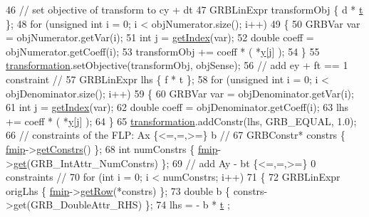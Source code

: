 \begin{DoxyCode}
46   \textcolor{comment}{// set objective of transform to cy + dt}
47   GRBLinExpr transformObj \{ d * \hyperlink{classgrbfrc_1_1CharnesCooper_a8e03048a467411b2147ef10acad3ff4f}{t} \};
48   \textcolor{keywordflow}{for} (\textcolor{keywordtype}{unsigned} \textcolor{keywordtype}{int} i = 0; i < objNumerator.size(); i++)
49    \{
50     GRBVar var = objNumerator.getVar(i);
51     \textcolor{keywordtype}{int} j = \hyperlink{classgrbfrc_1_1CharnesCooper_a48c5969100c05b92d2f60e8f48925b0d}{getIndex}(var);
52     \textcolor{keywordtype}{double} coeff = objNumerator.getCoeff(i);
53     transformObj += coeff * ( *\hyperlink{classgrbfrc_1_1CharnesCooper_a19e3874ce0b6242d4b7f8491bfae472f}{y}[j] );
54    \}
55   \hyperlink{classgrbfrc_1_1CharnesCooper_a9107f891576f27501e5f103dca964359}{transformation}.setObjective(transformObj, objSense);
56   \textcolor{comment}{// add ey + ft == 1 constraint //}
57   GRBLinExpr lhs \{ f * t \};
58   \textcolor{keywordflow}{for} (\textcolor{keywordtype}{unsigned} \textcolor{keywordtype}{int} i = 0; i < objDenominator.size(); i++)
59    \{
60     GRBVar var = objDenominator.getVar(i);
61     \textcolor{keywordtype}{int} j = \hyperlink{classgrbfrc_1_1CharnesCooper_a48c5969100c05b92d2f60e8f48925b0d}{getIndex}(var);
62     \textcolor{keywordtype}{double} coeff = objDenominator.getCoeff(i);
63     lhs += coeff * ( *\hyperlink{classgrbfrc_1_1CharnesCooper_a19e3874ce0b6242d4b7f8491bfae472f}{y}[j] );
64    \}
65   \hyperlink{classgrbfrc_1_1CharnesCooper_a9107f891576f27501e5f103dca964359}{transformation}.addConstr(lhs, GRB\_EQUAL, 1.0);
66   \textcolor{comment}{// constraints of the FLP: Ax \{<=,=,>=\} b //}
67   GRBConstr* constrs \{ \hyperlink{classgrbfrc_1_1CharnesCooper_a107817ee13698551fae6263c8849f730}{fmip}->\hyperlink{classgrbfrc_1_1FMILP_aa6a2087036235f6255f9f779e2303768}{getConstrs}() \};
68   \textcolor{keywordtype}{int} numConstrs \{ \hyperlink{classgrbfrc_1_1CharnesCooper_a107817ee13698551fae6263c8849f730}{fmip}->\hyperlink{classgrbfrc_1_1FMILP_a5f74659534b60535f4cacce86ac94c23}{get}(GRB\_IntAttr\_NumConstrs) \};
69   \textcolor{comment}{// add Ay - bt \{<=,=,>=\} 0 constraints //}
70   \textcolor{keywordflow}{for} (\textcolor{keywordtype}{int} i = 0; i < numConstrs; i++)
71    \{
72     GRBLinExpr origLhs \{ \hyperlink{classgrbfrc_1_1CharnesCooper_a107817ee13698551fae6263c8849f730}{fmip}->\hyperlink{classgrbfrc_1_1FMILP_a13b7ccccee5b9592cb5a15830c0f06c7}{getRow}(*constrs) \};
73     \textcolor{keywordtype}{double} b \{ constrs->get(GRB\_DoubleAttr\_RHS) \};
74     lhs = - b * \hyperlink{classgrbfrc_1_1CharnesCooper_a8e03048a467411b2147ef10acad3ff4f}{t} ;

\end{DoxyCode}
